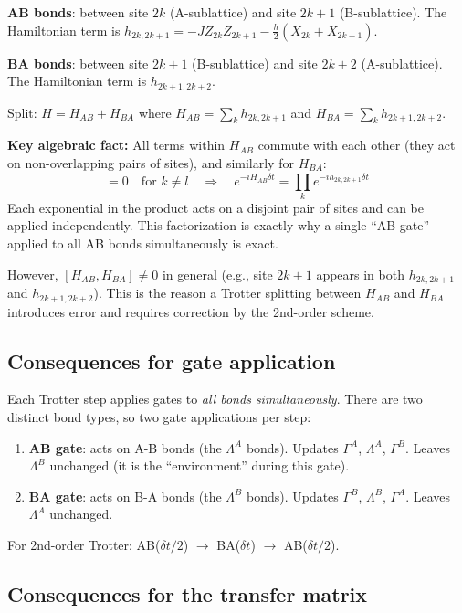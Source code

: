 \documentclass[11pt, a4paper]{article}
\begin{document}
\textbf{AB bonds}: between site $2k$ (A-sublattice) and site $2k+1$ (B-sublattice). The Hamiltonian term is $h_{2k,2k+1} = -JZ_{2k}Z_{2k+1} - \tfrac{h}{2}(X_{2k} + X_{2k+1})$.

\textbf{BA bonds}: between site $2k+1$ (B-sublattice) and site $2k+2$ (A-sublattice). The Hamiltonian term is $h_{2k+1,2k+2}$.

Split: $H = H_{AB} + H_{BA}$ where $H_{AB} = \sum_k h_{2k,2k+1}$ and $H_{BA} = \sum_k h_{2k+1,2k+2}$.

\textbf{Key algebraic fact:} All terms within $H_{AB}$ commute with each other (they act on non-overlapping pairs of sites), and similarly for $H_{BA}$:
\begin{equation}
  [h_{2k,2k+1},\; h_{2l,2l+1}] = 0 \quad \text{for } k \neq l \quad \Rightarrow \quad e^{-iH_{AB}\delta t} = \prod_k e^{-ih_{2k,2k+1}\delta t}
\end{equation}
Each exponential in the product acts on a disjoint pair of sites and can be applied independently. This factorization is exactly why a single ``AB gate'' applied to all AB bonds simultaneously is exact.

However, $[H_{AB}, H_{BA}] \neq 0$ in general (e.g., site $2k+1$ appears in both $h_{2k,2k+1}$ and $h_{2k+1,2k+2}$). This is the reason a Trotter splitting between $H_{AB}$ and $H_{BA}$ introduces error and requires correction by the 2nd-order scheme.

\subsection{Consequences for gate application}

Each Trotter step applies gates to \emph{all bonds simultaneously}. There are two distinct bond types, so two gate applications per step:
\begin{enumerate}
  \item \textbf{AB gate}: acts on A-B bonds (the $\Lambda^A$ bonds). Updates $\Gamma^A$, $\Lambda^A$, $\Gamma^B$. Leaves $\Lambda^B$ unchanged (it is the ``environment'' during this gate).
  \item \textbf{BA gate}: acts on B-A bonds (the $\Lambda^B$ bonds). Updates $\Gamma^B$, $\Lambda^B$, $\Gamma^A$. Leaves $\Lambda^A$ unchanged.
\end{enumerate}
For 2nd-order Trotter: AB($\delta t/2$) $\to$ BA($\delta t$) $\to$ AB($\delta t/2$).

\subsection{Consequences for the transfer matrix}
\end{document}
